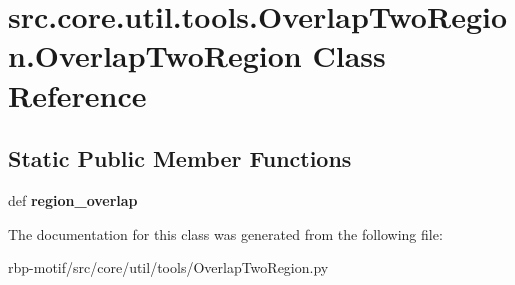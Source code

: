 \hypertarget{classsrc_1_1core_1_1util_1_1tools_1_1OverlapTwoRegion_1_1OverlapTwoRegion}{\section{src.\-core.\-util.\-tools.\-Overlap\-Two\-Region.\-Overlap\-Two\-Region Class Reference}
\label{classsrc_1_1core_1_1util_1_1tools_1_1OverlapTwoRegion_1_1OverlapTwoRegion}
}
\subsection*{Static Public Member Functions}
\begin{DoxyCompactItemize}
\item 
\hypertarget{classsrc_1_1core_1_1util_1_1tools_1_1OverlapTwoRegion_1_1OverlapTwoRegion_aa7c987eff2f28d49930db85b5c14fd7e}{def {\bfseries region\-\_\-overlap}}\label{classsrc_1_1core_1_1util_1_1tools_1_1OverlapTwoRegion_1_1OverlapTwoRegion_aa7c987eff2f28d49930db85b5c14fd7e}

\end{DoxyCompactItemize}


The documentation for this class was generated from the following file\-:\begin{DoxyCompactItemize}
\item 
rbp-\/motif/src/core/util/tools/Overlap\-Two\-Region.\-py\end{DoxyCompactItemize}
